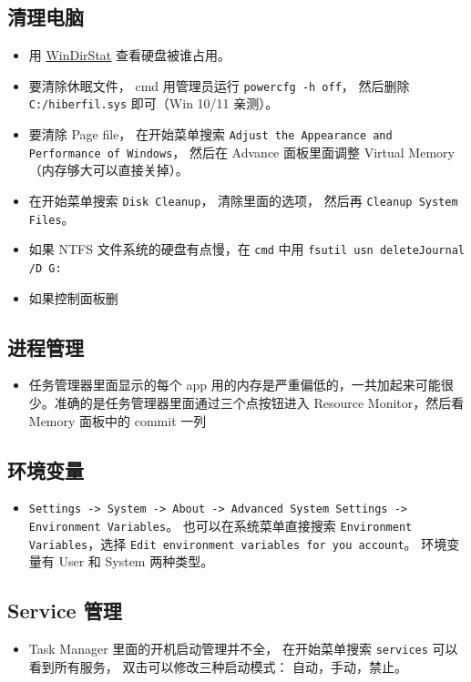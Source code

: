 \subsection{清理电脑}
\begin{itemize}
\item 用 \href{https://windirstat.net/}{WinDirStat} 查看硬盘被谁占用。
\item 要清除休眠文件， cmd 用管理员运行 \verb`powercfg -h off`， 然后删除 \verb`C:/hiberfil.sys` 即可（Win 10/11 亲测）。
\item 要清除 Page file， 在开始菜单搜索 \verb`Adjust the Appearance and Performance of Windows`， 然后在 Advance 面板里面调整 Virtual Memory（内存够大可以直接关掉）。
\item 在开始菜单搜索 \verb`Disk Cleanup`， 清除里面的选项， 然后再 \verb`Cleanup System Files`。
\item 如果 NTFS 文件系统的硬盘有点慢，在 \verb`cmd` 中用 \verb`fsutil usn deleteJournal /D G:`
\item 如果控制面板删
\end{itemize}

\subsection{进程管理}
\begin{itemize}
\item 任务管理器里面显示的每个 app 用的内存是严重偏低的，一共加起来可能很少。准确的是任务管理器里面通过三个点按钮进入 Resource Monitor，然后看 Memory 面板中的 commit 一列
\end{itemize}

\subsection{环境变量}
\begin{itemize}
\item \verb`Settings -> System -> About -> Advanced System Settings -> Environment Variables`。 也可以在系统菜单直接搜索 \verb`Environment Variables`，选择 \verb`Edit environment variables for you account`。 环境变量有 User 和 System 两种类型。
\end{itemize}

\subsection{Service 管理}
\begin{itemize}
\item Task Manager 里面的开机启动管理并不全， 在开始菜单搜索 \verb`services` 可以看到所有服务， 双击可以修改三种启动模式： 自动，手动，禁止。
\end{itemize}

